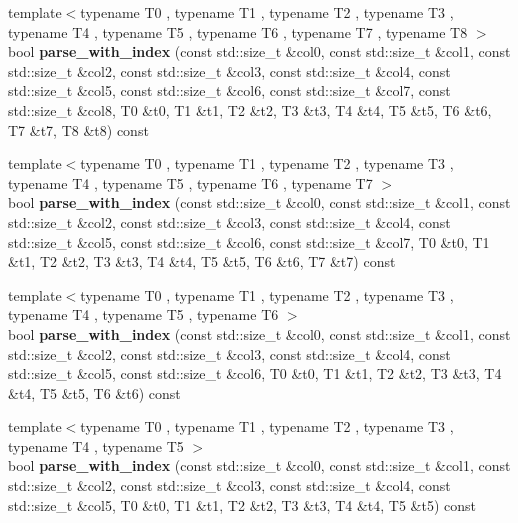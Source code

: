 \begin{DoxyCompactItemize}
\item 
\hypertarget{classstrtk_1_1token__grid_1_1row__type_a84fc2aa7bea78e1ecc3b99bcdfbd7d9d}{{\footnotesize template$<$typename T0 , typename T1 , typename T2 , typename T3 , typename T4 , typename T5 , typename T6 , typename T7 , typename T8 $>$ }\\bool {\bfseries parse\-\_\-with\-\_\-index} (const std\-::size\-\_\-t \&col0, const std\-::size\-\_\-t \&col1, const std\-::size\-\_\-t \&col2, const std\-::size\-\_\-t \&col3, const std\-::size\-\_\-t \&col4, const std\-::size\-\_\-t \&col5, const std\-::size\-\_\-t \&col6, const std\-::size\-\_\-t \&col7, const std\-::size\-\_\-t \&col8, T0 \&t0, T1 \&t1, T2 \&t2, T3 \&t3, T4 \&t4, T5 \&t5, T6 \&t6, T7 \&t7, T8 \&t8) const }\label{classstrtk_1_1token__grid_1_1row__type_a84fc2aa7bea78e1ecc3b99bcdfbd7d9d}

\item 
\hypertarget{classstrtk_1_1token__grid_1_1row__type_a1f6179df2fa5247e7a36e2e0c3c2e042}{{\footnotesize template$<$typename T0 , typename T1 , typename T2 , typename T3 , typename T4 , typename T5 , typename T6 , typename T7 $>$ }\\bool {\bfseries parse\-\_\-with\-\_\-index} (const std\-::size\-\_\-t \&col0, const std\-::size\-\_\-t \&col1, const std\-::size\-\_\-t \&col2, const std\-::size\-\_\-t \&col3, const std\-::size\-\_\-t \&col4, const std\-::size\-\_\-t \&col5, const std\-::size\-\_\-t \&col6, const std\-::size\-\_\-t \&col7, T0 \&t0, T1 \&t1, T2 \&t2, T3 \&t3, T4 \&t4, T5 \&t5, T6 \&t6, T7 \&t7) const }\label{classstrtk_1_1token__grid_1_1row__type_a1f6179df2fa5247e7a36e2e0c3c2e042}

\item 
\hypertarget{classstrtk_1_1token__grid_1_1row__type_aa546694dacbe71bf31cd42925f39a0b9}{{\footnotesize template$<$typename T0 , typename T1 , typename T2 , typename T3 , typename T4 , typename T5 , typename T6 $>$ }\\bool {\bfseries parse\-\_\-with\-\_\-index} (const std\-::size\-\_\-t \&col0, const std\-::size\-\_\-t \&col1, const std\-::size\-\_\-t \&col2, const std\-::size\-\_\-t \&col3, const std\-::size\-\_\-t \&col4, const std\-::size\-\_\-t \&col5, const std\-::size\-\_\-t \&col6, T0 \&t0, T1 \&t1, T2 \&t2, T3 \&t3, T4 \&t4, T5 \&t5, T6 \&t6) const }\label{classstrtk_1_1token__grid_1_1row__type_aa546694dacbe71bf31cd42925f39a0b9}

\item 
\hypertarget{classstrtk_1_1token__grid_1_1row__type_ab0a3c00a32f9761d727fd9112518cd82}{{\footnotesize template$<$typename T0 , typename T1 , typename T2 , typename T3 , typename T4 , typename T5 $>$ }\\bool {\bfseries parse\-\_\-with\-\_\-index} (const std\-::size\-\_\-t \&col0, const std\-::size\-\_\-t \&col1, const std\-::size\-\_\-t \&col2, const std\-::size\-\_\-t \&col3, const std\-::size\-\_\-t \&col4, const std\-::size\-\_\-t \&col5, T0 \&t0, T1 \&t1, T2 \&t2, T3 \&t3, T4 \&t4, T5 \&t5) const }\label{classstrtk_1_1token__grid_1_1row__type_ab0a3c00a32f9761d727fd9112518cd82}


\end{DoxyCompactItemize}
